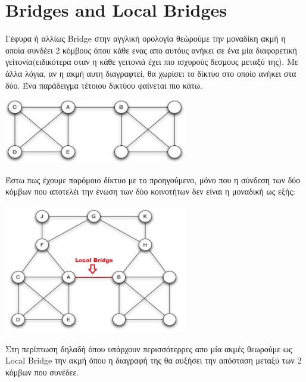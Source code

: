 \documentclass[12pt]{article}
\begin{document}
	
	\newpage
	\section{Bridges and Local Bridges}
	Γέφυρα ή αλλίως Bridge στην αγγλική ορολογία θεώρούμε την μοναδίκη ακμή η οποία συνδέει 2 κόμβους όπου κάθε ενας απο αυτόυς ανήκει σε ένα μία διαφορετική γείτονία(ειδικότερα οταν η κάθε γειτονιά έχει πιο ισχυρούς δεσμους μεταξύ της). Με άλλα λόγια, αν η ακμή αυτη διαγραφτεί, θα χωρίσει το δίκτυο στο οποίο ανήκει στα δύο. Ένα παράδειγμα τέτοιου δικτύου φαίνεται πιο κάτω.
	\begin{center}
		\includegraphics[width=0.6\textwidth]{photos-files/section9/bridge_example.jpg}
	\end{center}
	\vspace{12pt}
	Έστω πως έχουμε παρόμοιο δίκτυο με το προηγούμενο, μόνο που η σύνδεση των δύο κόμβων που αποτελέι την ένωση των δύο κοινοτήτων δεν είναι η μοναδική ως εξής:
	\begin{center}
		\includegraphics[width=0.6\textwidth]{photos-files/section9/local_bridge_example.jpg}
	\end{center}
	\vspace{12pt}
	Στη περίπτωση δηλαδή όπου υπάρχουν περισσότερρες απο μία ακμές θεωρούμε ως Local Bridge την ακμή όπου η διαγραφή της θα αυξήσει την απόσταση μεταξύ των 2 κόμβων που συνέδεε.
	
\end{document}

